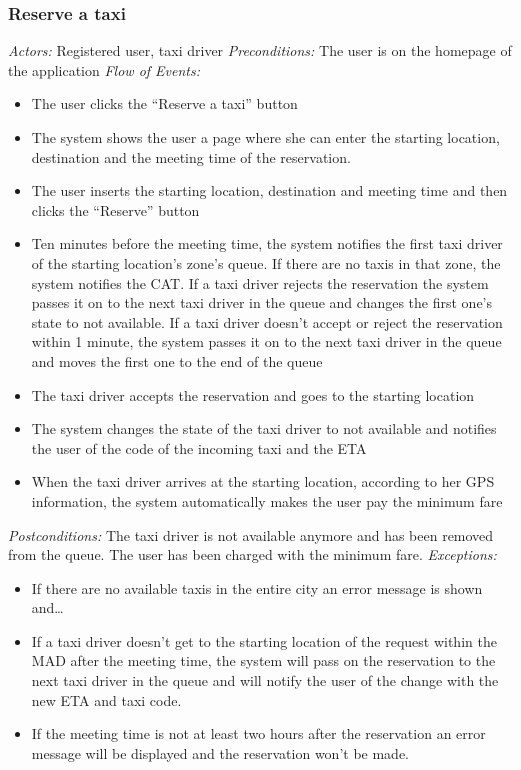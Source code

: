 \documentclass{article}
\begin{document}
	\subsubsection{Reserve a taxi}
	\textit{Actors:} Registered user, taxi driver
	\textit{Preconditions:} The user is on the homepage of the application %
	\textit{Flow of Events:}
	\begin{itemize}
		\item  The user clicks the ``Reserve a taxi'' button
		\item  The system shows the user a page where she can enter the starting location, destination and the meeting time of the reservation.
		\item  The user inserts the starting location, destination and meeting time and then clicks the ``Reserve'' button
		\item  Ten minutes before the meeting time, the system notifies the first taxi driver of the starting location's zone's queue. If there are no taxis in that zone, the system notifies the CAT\@. If a taxi driver rejects the reservation the system passes it on to the next taxi driver in the queue and changes the first one's state to not available. If a taxi driver doesn't accept or reject the reservation within 1 minute, the system passes it on to the next taxi driver in the queue and moves the first one to the end of the queue
		\item  The taxi driver accepts the reservation and goes to the starting location
		\item  The system changes the state of the taxi driver to not available and notifies the user of the code of the incoming taxi and the ETA
		\item  When the taxi driver arrives at the starting location, according to her GPS information, the system automatically makes the user pay the minimum fare
	\end{itemize}
	\textit{Postconditions:} The taxi driver is not available anymore and has been removed from the queue. The user has been charged with the minimum fare. %
	\textit{Exceptions:}
	\begin{itemize} 
		\item If there are no available taxis in the entire city an error message is shown and\ldots %
		\item If a taxi driver doesn't get to the starting location of the request within the MAD after the meeting time, the system will pass on the reservation to the next taxi driver in the queue and will notify the user of the change with the new ETA and taxi code.
		\item If the meeting time is not at least two hours after the reservation an error message will be displayed and the reservation won't be made.
	\end{itemize}
	\clearpage
\end{document}
